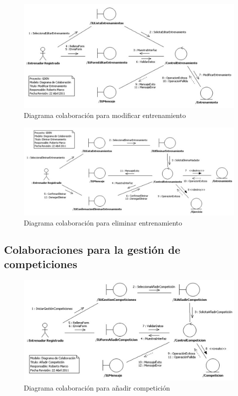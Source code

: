 			\begin{figure}[H]
			  \centering
			    \includegraphics[width=16cm]{./eps/colaboraciones/gestion_entrenamiento/ModificarEntrenamiento.eps}
			  \caption{Diagrama colaboración para modificar entrenamiento}
			  \label{fig:col_modificar_entrenamiento}
			\end{figure}
			
			\begin{figure}[H]
			  \centering
			    \includegraphics[width=16cm]{./eps/colaboraciones/gestion_entrenamiento/EliminarEntrenamiento.eps}
			  \caption{Diagrama colaboración para eliminar entrenamiento}
			  \label{fig:col_eliminar_entrenamiento}
			\end{figure}
	
		\subsection{Colaboraciones para la gestión de competiciones} %
			\label{sub:colaboraciones_para_la_gestion_de_competiciones}
		
			\begin{figure}[H]
			  \centering
			    \includegraphics[width=16cm]{./eps/colaboraciones/gestion_competiciones/AnadirCompeticion.eps}
			  \caption{Diagrama colaboración para añadir competición}
			  \label{fig:col_anadir_competicion}
			\end{figure}
			
